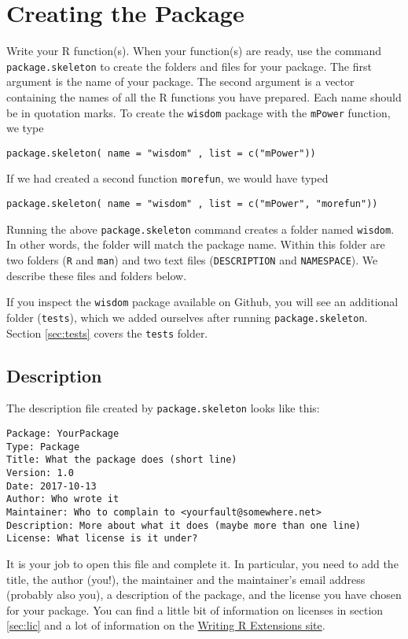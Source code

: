 \documentclass{article}
\begin{document}
\section{Creating the Package}
Write your R function(s). When your function(s) are ready, use the command \texttt{package.skeleton} to create the folders and files for your package. The first argument is  the name of your package. The second argument is a vector containing the names of all the R functions you have prepared. Each name should be in quotation marks. To create the \texttt{wisdom} package with the \texttt{mPower} function, we type
\begin{verbatim}
package.skeleton( name = "wisdom" , list = c("mPower"))
\end{verbatim}
If we had created a second function \texttt{morefun}, we would have typed
\begin{verbatim}
package.skeleton( name = "wisdom" , list = c("mPower", "morefun"))
\end{verbatim}
Running the above \texttt{package.skeleton} command  creates a folder named \texttt{wisdom}. In other words, the folder will match the package name.
Within this folder are two folders (\texttt{R} and \texttt{man}) and two text files (\texttt{DESCRIPTION} and \texttt{NAMESPACE}). We describe these files and folders below.

If you inspect the \texttt{wisdom} package available on Github, you will see an additional folder (\texttt{tests}), which we added ourselves after running  \texttt{package.skeleton}. Section \ref{sec:tests} covers the \texttt{tests} folder.




\subsection{Description}
The description file created by  \texttt{package.skeleton} looks like this:
\begin{verbatim}
Package: YourPackage
Type: Package
Title: What the package does (short line)
Version: 1.0
Date: 2017-10-13
Author: Who wrote it
Maintainer: Who to complain to <yourfault@somewhere.net>
Description: More about what it does (maybe more than one line)
License: What license is it under?
\end{verbatim}
It is your job to open this file and complete it. In particular, you need to add the title, the author (you!), the maintainer and the maintainer's email address (probably also you), a description of the package, and the license you have chosen for your package. You can find a little bit of information on licenses in section \ref{sec:lic} and a lot of information on the \href{https://cran.r-project.org/doc/manuals/R-exts.html#Licensing}{Writing R Extensions site}. \\
\end{document}
